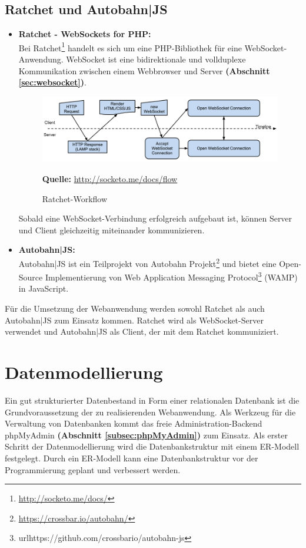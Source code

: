\subsection{Ratchet und Autobahn|JS}
\label{subsce:Ratchet und Autobahn|JS}
\begin{itemize}
\item \textbf{Ratchet - WebSockets for PHP:}\\
Bei Ratchet\footnote{\url{http://socketo.me/docs/}} handelt es sich um eine PHP-Bibliothek für eine WebSocket-Anwendung. WebSocket ist eine bidirektionale und vollduplexe Kommunikation zwischen einem Webbrowser und Server \textbf{(Abschnitt \ref{sec:websocket})}.\bigskip

\begin{figure}[H]
  \begin{center}
    \includegraphics[scale=0.4]{img/RatchetFlow}
	\caption{Ratchet-Workflow} 
	\footnotesize\sffamily\textbf{Quelle:} \url{http://socketo.me/docs/flow}  
	\label{fig:ratchet-workflow}
  \end{center}   
\end{figure}

Sobald eine WebSocket-Verbindung erfolgreich aufgebaut ist, können Server und Client gleichzeitig miteinander kommunizieren.

\item \textbf{Autobahn|JS:}\\
Autobahn|JS ist ein Teilprojekt von Autobahn Projekt\footnote{\url{https://crossbar.io/autobahn/}} und bietet eine Open-Source Implementierung von Web Application Messaging Protocol\footnote{url{https://github.com/crossbario/autobahn-js}} (WAMP) in JavaScript.
\end{itemize}

Für die Umsetzung der Webanwendung werden sowohl Ratchet als auch Autobahn|JS zum Einsatz kommen. Ratchet wird als WebSocket-Server verwendet und Autobahn|JS als Client, der mit dem Ratchet kommuniziert.

\section{Datenmodellierung}
\label{sec:Datenmodellierung}
Ein gut strukturierter Datenbestand in Form einer relationalen Datenbank ist die Grundvoraussetzung der zu realisierenden Webanwendung. Als Werkzeug für die Verwaltung von Datenbanken kommt das freie Administration-Backend phpMyAdmin \textbf{(Abschnitt \ref{subsec:phpMyAdmin})} zum Einsatz. Als erster Schritt der Datenmodellierung wird die Datenbankstruktur mit einem ER-Modell festgelegt. Durch ein ER-Modell kann eine Datenbankstruktur vor der Programmierung geplant und verbessert werden. 

